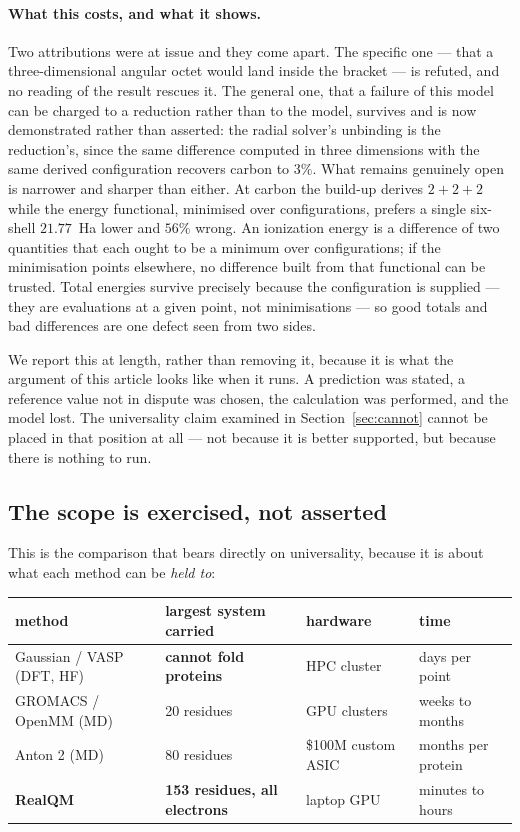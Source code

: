 \documentclass[11pt]{article}
\begin{document}
\paragraph{What this costs, and what it shows.} Two attributions were at issue and they come apart.
The specific one --- that a three-dimensional angular octet would land inside the bracket --- is
refuted, and no reading of the result rescues it. The general one, that a failure of this model can
be charged to a reduction rather than to the model, survives and is now demonstrated rather than
asserted: the radial solver's unbinding is the reduction's, since the same difference computed in
three dimensions with the same derived configuration recovers carbon to $3\%$. What remains
genuinely open is narrower and sharper than either. At carbon the build-up derives $2{+}2{+}2$ while
the energy functional, minimised over configurations, prefers a single six-shell $21.77$~Ha lower
and $56\%$ wrong. An ionization energy is a difference of two quantities that each ought to be a
minimum over configurations; if the minimisation points elsewhere, no difference built from that
functional can be trusted. Total energies survive precisely because the configuration is supplied
--- they are evaluations at a given point, not minimisations --- so good totals and bad differences
are one defect seen from two sides.

We report this at length, rather than removing it, because it is what the argument of this article
looks like when it runs. A prediction was stated, a reference value not in dispute was chosen, the
calculation was performed, and the model lost. The universality claim examined in
Section~\ref{sec:cannot} cannot be placed in that position at all --- not because it is better
supported, but because there is nothing to run.

\subsection{The scope is exercised, not asserted}

This is the comparison that bears directly on universality, because it is about what each method
can be \emph{held to}:

\begin{center}
\begin{tabular}{llll}
\toprule
method & largest system carried & hardware & time \\
\midrule
Gaussian / VASP (DFT, HF)~\cite{HK64,KS65}  & \textbf{cannot fold proteins} & HPC cluster & days per point \\
GROMACS / OpenMM (MD)      & 20 residues & GPU clusters & weeks to months \\
Anton 2 (MD)~\cite{Shaw2014}  & 80 residues & \$100M custom ASIC & months per protein \\
\textbf{RealQM}            & \textbf{153 residues, all electrons} & laptop GPU & minutes to hours \\
\bottomrule
\end{tabular}
\end{center}
\end{document}
